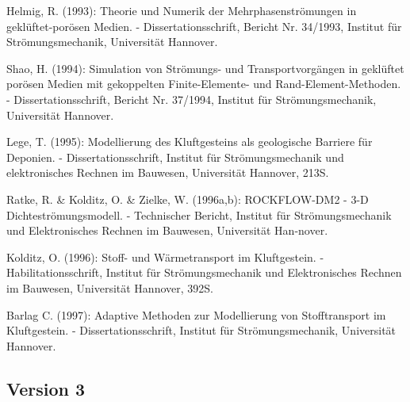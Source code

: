 \begin{list}{}{\setlength{\itemindent}{-.5cm}}
\item Helmig, R. (1993): Theorie und Numerik der Mehrphasenstr\"{o}mungen in gekl\"{u}ftet-por\"{o}sen Medien.
  - Dissertationsschrift, Bericht Nr. 34/1993, Institut f\"{u}r Str\"{o}\-mungs\-mechanik, Universit\"{a}t Hannover.

\item Shao, H. (1994): Simulation von Str\"{o}mungs- und Transportvorg\"{a}ngen in gekl\"{u}ftet por\"{o}sen Medien mit
  gekoppelten Finite-Elemente- und Rand-Element-Methoden.
  - Dissertationsschrift, Bericht Nr. 37/1994, Institut f\"{u}r Str\"{o}\-mungs\-mechanik, Universit\"{a}t Hannover.

\item Lege, T. (1995): Modellierung des Kluftgesteins als geologische Barriere f\"{u}r Deponien.
  - Dissertationsschrift,  Institut f\"{u}r Str\"{o}\-mungs\-mechanik und elektronisches Rechnen im Bauwesen, Universit\"{a}t Hannover, 213S.

\item Ratke, R. \& Kolditz, O. \& Zielke, W.  (1996a,b): ROCKFLOW-DM2 - 3-D Dichte\-str\"{o}\-mungsmodell.
  - Technischer Bericht, Institut f\"{u}r Str\"{o}\-mungs\-mechanik und Elektronisches Rechnen im Bauwesen, Universit\"{a}t Han-nover.

\item Kolditz, O. (1996): Stoff- und W\"{a}rmetransport im Kluftgestein. - Habi\-litations\-schrift,
  Institut f\"{u}r Str\"{o}\-mungs\-mechanik und Elektronisches Rechnen im Bauwesen, Universit\"{a}t Hannover, 392S.

\item Barlag C. (1997): Adaptive Methoden zur Modellierung von Stofftransport im Kluftgestein.
  - Dissertationsschrift, Institut f\"{u}r Str\"{o}\-mungs\-mechanik, Universit\"{a}t Hannover.
\end{list}


\subsection*{Version 3}


